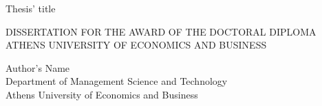 \centering

\vspace*{0.5cm}
{\Huge Thesis' title \par}
\vspace{6cm}
{\Large\scshape DISSERTATION FOR THE AWARD OF THE DOCTORAL DIPLOMA \\
ATHENS UNIVERSITY OF ECONOMICS AND BUSINESS\par}
\vspace{4.5cm}
{\large \the\year\par}

\vspace{4.5cm}

Author's Name \\
Department of Management Science and Technology \\
Athens University of Economics and Business
